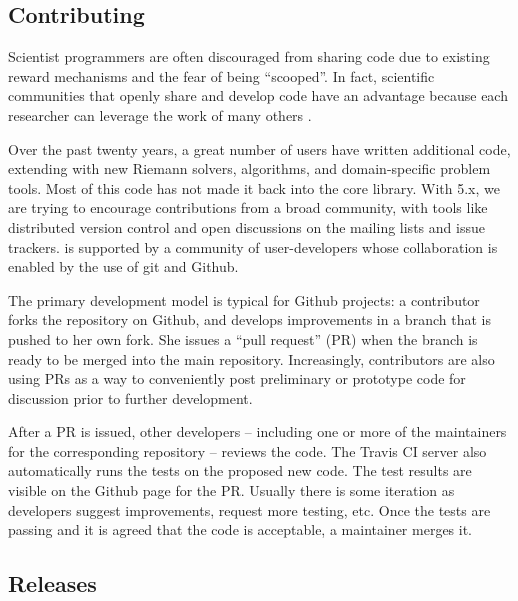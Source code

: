 \subsection{Contributing}


Scientist programmers are often discouraged from sharing code
due to existing reward mechanisms and the fear of being ``scooped''.
In fact, scientific communities that openly share and develop code
have an advantage because each researcher can leverage the work of
many others \cite{turk2013scaling}.

Over the past twenty years, a great number of users have written
additional code, extending \clawpack with new Riemann solvers,
algorithms, and domain-specific problem tools.  Most of this code
has not made it back into the core library.  With \clawpack 5.x,
we are trying to encourage contributions from a broad community, with
tools like distributed version control and open discussions on 
the mailing lists and issue trackers.
\clawpack is supported by a community of user-developers whose
collaboration is enabled by the use of git and Github.



The primary development model
is typical for Github projects: a contributor forks the repository on Github,
and develops improvements in a branch that is pushed to her own fork.
She issues a ``pull request'' (PR) when the branch is ready to be merged
into the main repository.  Increasingly, contributors are also using
PRs as a way to conveniently post preliminary or prototype code for
discussion prior to further development.

After a PR is issued, other developers -- including one or more of the
maintainers for the corresponding repository -- reviews the code.  The Travis
CI server also automatically runs the tests on the proposed new code.  The test
results are visible on the Github page for the PR.  Usually there is some
iteration as developers suggest improvements, request more testing, etc.
Once the tests are passing and it is agreed that the code is acceptable, a
maintainer merges it.

\subsection{Releases}

